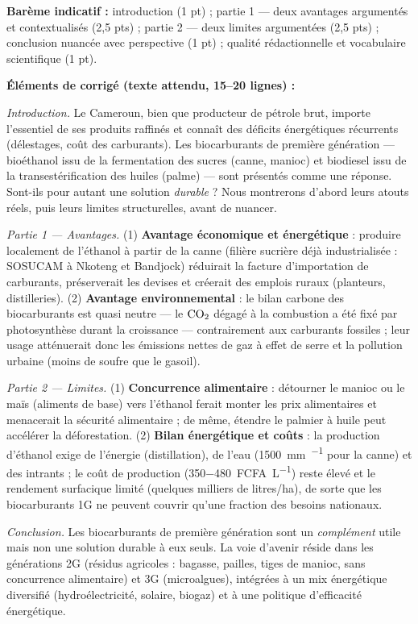 \documentclass[11pt]{article}
\begin{document}
\begin{corrige}
\textbf{Barème indicatif :} introduction (1 pt) ; partie 1 — deux avantages argumentés et contextualisés (2,5 pts) ; partie 2 — deux limites argumentées (2,5 pts) ; conclusion nuancée avec perspective (1 pt) ; qualité rédactionnelle et vocabulaire scientifique (1 pt).

\textbf{Éléments de corrigé (texte attendu, 15--20 lignes) :}

\emph{Introduction.} Le Cameroun, bien que producteur de pétrole brut, importe l'essentiel de ses produits raffinés et connaît des déficits énergétiques récurrents (délestages, coût des carburants). Les biocarburants de première génération — bioéthanol issu de la fermentation des sucres (canne, manioc) et biodiesel issu de la transestérification des huiles (palme) — sont présentés comme une réponse. Sont-ils pour autant une solution \emph{durable} ? Nous montrerons d'abord leurs atouts réels, puis leurs limites structurelles, avant de nuancer.

\emph{Partie 1 — Avantages.} (1) \textbf{Avantage économique et énergétique} : produire localement de l'éthanol à partir de la canne (filière sucrière déjà industrialisée : SOSUCAM à Nkoteng et Bandjock) réduirait la facture d'importation de carburants, préserverait les devises et créerait des emplois ruraux (planteurs, distilleries). (2) \textbf{Avantage environnemental} : le bilan carbone des biocarburants est quasi neutre — le $\ce{CO2}$ dégagé à la combustion a été fixé par photosynthèse durant la croissance — contrairement aux carburants fossiles ; leur usage atténuerait donc les émissions nettes de gaz à effet de serre et la pollution urbaine (moins de soufre que le gasoil).

\emph{Partie 2 — Limites.} (1) \textbf{Concurrence alimentaire} : détourner le manioc ou le maïs (aliments de base) vers l'éthanol ferait monter les prix alimentaires et menacerait la sécurité alimentaire ; de même, étendre le palmier à huile peut accélérer la déforestation. (2) \textbf{Bilan énergétique et coûts} : la production d'éthanol exige de l'énergie (distillation), de l'eau (\SI{1500}{mm\per\an} pour la canne) et des intrants ; le coût de production (\SI{350-480}{FCFA\per\liter}) reste élevé et le rendement surfacique limité (quelques milliers de litres/ha), de sorte que les biocarburants 1G ne peuvent couvrir qu'une fraction des besoins nationaux.

\emph{Conclusion.} Les biocarburants de première génération sont un \emph{complément} utile mais non une solution durable à eux seuls. La voie d'avenir réside dans les générations 2G (résidus agricoles : bagasse, pailles, tiges de manioc, sans concurrence alimentaire) et 3G (microalgues), intégrées à un mix énergétique diversifié (hydroélectricité, solaire, biogaz) et à une politique d'efficacité énergétique.


\end{corrige}
\end{document}
